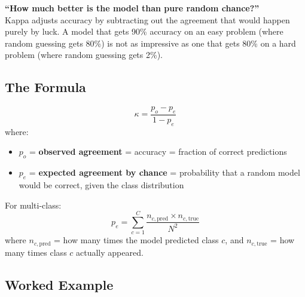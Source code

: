 \documentclass[12pt, a4paper]{article}
\begin{document}
\begin{keyidea}
\textbf{``How much better is the model than pure random chance?''}\\[0.3cm]
Kappa adjusts accuracy by subtracting out the agreement that would happen purely by luck. A model that gets 90\% accuracy on an easy problem (where random guessing gets 80\%) is not as impressive as one that gets 80\% on a hard problem (where random guessing gets 2\%).
\end{keyidea}

\subsection{The Formula}

\begin{formulabox}
\[
\boxed{\kappa = \frac{p_o - p_e}{1 - p_e}}
\]
where:
\begin{itemize}
    \item $p_o$ = \textbf{observed agreement} = accuracy = fraction of correct predictions
    \item $p_e$ = \textbf{expected agreement by chance} = probability that a random model would be correct, given the class distribution
\end{itemize}

For multi-class:
\[
p_e = \sum_{c=1}^{C} \frac{n_{c,\text{pred}} \times n_{c,\text{true}}}{N^2}
\]
where $n_{c,\text{pred}}$ = how many times the model predicted class $c$, and $n_{c,\text{true}}$ = how many times class $c$ actually appeared.
\end{formulabox}

\subsection{Worked Example}
\end{document}
